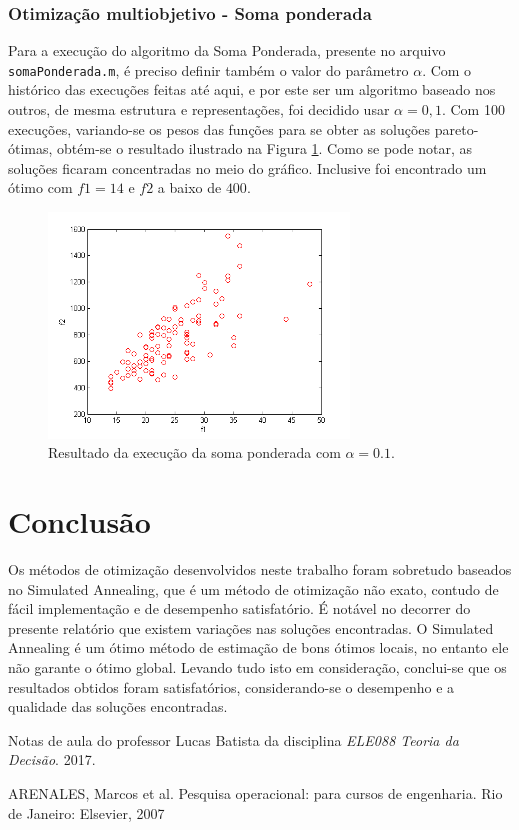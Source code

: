 \documentclass[conference]{IEEEtran}
\begin{document}
\subsubsection{Otimização multiobjetivo - Soma ponderada}
Para a execução do algoritmo da Soma Ponderada, presente no arquivo \texttt{somaPonderada.m}, é preciso definir também o valor do parâmetro $\alpha$. Com o histórico das execuções feitas até aqui, e por este ser um algoritmo baseado nos outros, de mesma estrutura e representações, foi decidido usar $\alpha = 0,1$. Com 100 execuções, variando-se os pesos das funções para se obter as soluções pareto-ótimas, obtém-se o resultado ilustrado na Figura \ref{fig:result-sp}. Como se pode notar, as soluções ficaram concentradas no meio do gráfico. Inclusive foi encontrado um ótimo com $f1 = 14$ e $f2$ a baixo de $400$.

	\begin{figure}[h]
		\centering
		\includegraphics[width=8cm]{img/result-sp.png}
		\caption{Resultado da execução da soma ponderada com $\alpha = 0.1$.}
		\label{fig:result-sp}
	\end{figure}

\section{Conclusão}
Os métodos de otimização desenvolvidos neste trabalho foram sobretudo baseados no Simulated Annealing, que é um método de otimização não exato, contudo de fácil implementação e de desempenho satisfatório. É notável no decorrer do presente relatório que existem variações nas soluções encontradas. O Simulated Annealing é um ótimo método de estimação
de bons ótimos locais, no entanto ele não garante o ótimo global. Levando tudo isto em consideração, conclui-se que os resultados obtidos foram satisfatórios, considerando-se o desempenho e a qualidade das soluções encontradas.

\begin{thebibliography}{1}

Notas de aula do professor Lucas Batista da disciplina \emph{ELE088 Teoria da Decisão}. 2017.

ARENALES, Marcos et al. Pesquisa operacional: para cursos de engenharia. Rio de Janeiro: Elsevier, 2007

\end{thebibliography}


\end{document}
